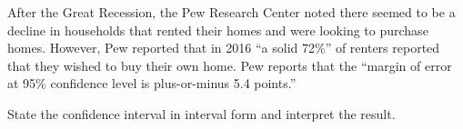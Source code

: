\documentclass[../mathNotesPreamble]{subfiles}
\begin{document}
    \begin{ex*}
      After the Great Recession, the Pew Research Center noted there seemed to be a decline in households that rented their homes and were looking to purchase homes. However, Pew reported that in 2016 ``a solid 72\%'' of renters reported that they wished to buy their own home. Pew reports that the ``margin of error at 95\% confidence level is plus-or-minus 5.4 points.''

      State the confidence interval in interval form and interpret the result.
    \end{ex*}
    \pagebreak

  \pagebreak
\end{document}
